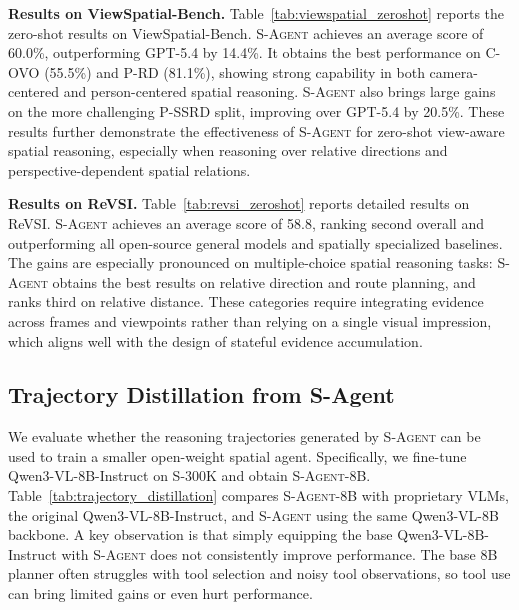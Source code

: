 \textbf{Results on ViewSpatial-Bench.}
Table~\ref{tab:viewspatial_zeroshot} reports the zero-shot results on ViewSpatial-Bench. \textsc{S-Agent} achieves an average score of 60.0\%, outperforming GPT-5.4 by 14.4\%. 
It obtains the best performance on C-OVO (55.5\%) and P-RD (81.1\%), showing strong capability in both camera-centered and person-centered spatial reasoning. 
\textsc{S-Agent} also brings large gains on the more challenging P-SSRD split, improving over GPT-5.4 by 20.5\%. These results further demonstrate the effectiveness of \textsc{S-Agent} for zero-shot view-aware spatial reasoning, especially when reasoning over relative directions and perspective-dependent spatial relations.

\textbf{Results on ReVSI.}
Table~\ref{tab:revsi_zeroshot} reports detailed results on ReVSI.
\textsc{S-Agent} achieves an average score of 58.8, ranking second overall and outperforming all open-source general models and spatially specialized baselines.
The gains are especially pronounced on multiple-choice spatial reasoning tasks: \textsc{S-Agent} obtains the best results on relative direction and route planning, and ranks third on relative distance.
These categories require integrating evidence across frames and viewpoints rather than relying on a single visual impression, which aligns well with the design of stateful evidence accumulation.






\subsection{Trajectory Distillation from S-Agent}
\label{sec:experiments:training}

We evaluate whether the reasoning trajectories generated by \textsc{S-Agent} can be used to train a smaller open-weight spatial agent. 
Specifically, we fine-tune Qwen3-VL-8B-Instruct on \textsc{S-300K} and obtain \textsc{S-Agent-8B}. 
Table~\ref{tab:trajectory_distillation} compares \textsc{S-Agent-8B} with proprietary VLMs, the original Qwen3-VL-8B-Instruct, and \textsc{S-Agent} using the same Qwen3-VL-8B backbone.
A key observation is that simply equipping the base Qwen3-VL-8B-Instruct with \textsc{S-Agent} does not consistently improve performance. 
The base 8B planner often struggles with tool selection and noisy tool observations, so tool use can bring limited gains or even hurt performance.


